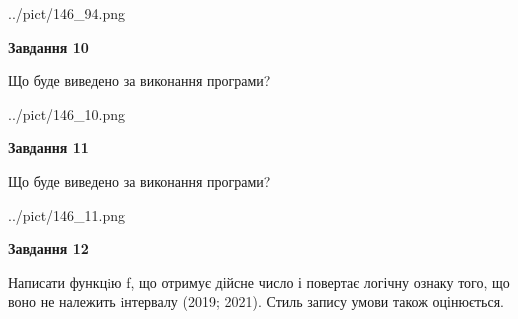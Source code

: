 \documentclass[12pt, ukrainian]{article}
\begin{document}
{\begin {large}
\begin{center}
	{../pict/146_94.png}
\end{center}
\newpage

{\begin {center}\textbf{Завдання 10}\end {center}}

Що буде виведено за виконання програми?\par
\begin{center}
	{../pict/146_10.png}
\end{center}
\newpage

{\begin {center}\textbf{Завдання 11}\end {center}}

Що буде виведено за виконання програми?\par
\begin{center}
	{../pict/146_11.png}
\end{center}
\newpage

{\begin {center}\textbf{Завдання 12}\end {center}}


Написати функцiю f, що отримує дійсне число і повертає логічну ознаку того, що воно не належить iнтервалу (2019; 2021). Стиль запису умови також оцінюється.\par
\newpage

\end {large}}
\end{document}
